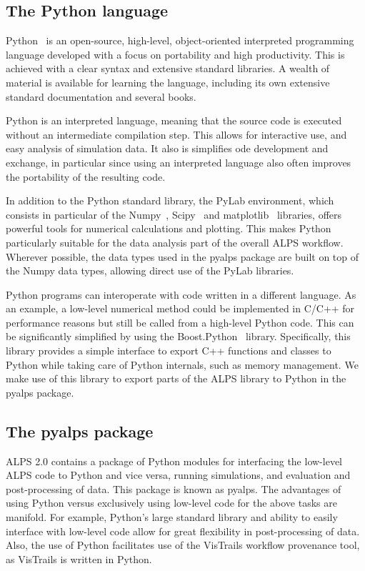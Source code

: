 \documentclass[12pt]{iopart}
\begin{document}
\subsection{The Python language}

Python~\cite{python} is an open-source, high-level, object-oriented interpreted programming language developed with a focus on portability and high productivity. This is achieved with a clear syntax and extensive standard libraries. A wealth of material is available for learning the language, including its own extensive standard documentation and several books\cite{LearningPython, ProgrammingPython}.

Python is an interpreted language, meaning that the source code is executed without an intermediate compilation step. This allows for interactive use, and easy analysis of simulation data. It also is simplifies ode development and exchange, in particular since using an interpreted language also often improves the portability of the resulting code.

In addition to the Python standard library, the PyLab environment, which consists in particular of the Numpy~\cite{numpy}, Scipy~\cite{scipy} and matplotlib~\cite{matplotlib} libraries, offers powerful tools for numerical calculations and plotting. This makes Python particularly suitable for the data analysis part of the overall ALPS workflow. Wherever possible, the data types used in the pyalps package are built on top of the Numpy data types, allowing direct use of the PyLab libraries.

Python programs can interoperate with code written in a different language. As an example, a low-level numerical method could be implemented in C/C++ for performance reasons but still be called from a high-level Python code. This can be significantly simplified by using the Boost.Python~\cite{boost} library. Specifically, this library provides a simple interface to export C++ functions and classes to Python while taking care of Python internals, such as memory management. We make use of this library to export parts of the ALPS library to Python in the pyalps package.

\subsection{The pyalps package}
ALPS 2.0 contains a package of Python modules for interfacing the low-level ALPS code to Python and vice versa, running simulations, and evaluation and post-processing of data. This package is known as pyalps. The advantages of using Python versus exclusively using low-level code for the above tasks are manifold. For example, Python's large standard library and ability to easily interface with low-level code allow for great flexibility in post-processing of data. Also, the use of Python facilitates use of the VisTrails workflow provenance tool, as VisTrails is written in Python.
\end{document}
